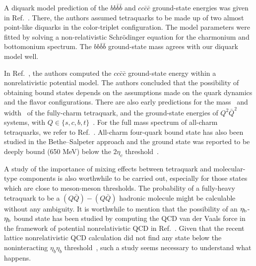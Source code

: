 \documentclass[twocolumn,showpacs,superscriptaddress,preprintnumbers,nofootinbib,prd]{revtex4-1}
\begin{document}
A diquark model prediction of the  $b b \bar b \bar b$ and $c c \bar c \bar c$
ground-state energies was given in Ref.~\cite{Berezhnoy:2011xn}.
There, the authors assumed tetraquarks to be made up of two almost point-like
diquarks in the color-triplet configuration. The model parameters were
fitted by solving a non-relativistic Schr\"odinger equation for the charmonium
and bottomonium spectrum. The $bb\bar b\bar b$ ground-state mass agrees with our
diquark model well.

In Ref.~\cite{Ader:1981db}, the authors computed the $c c \bar c \bar c$
ground-state energy within a nonrelativistic potential model.
The authors concluded that the possibility of obtaining bound states depends on
the assumptions made on the quark dynamics and the flavor configurations. There
are also early predictions for the mass~\cite{Iwasaki:1975pv} and width~\cite{chao:1981} of the
fully-charm tetraquark, and the ground-state energies of $Q^2 \bar{Q}^2$ systems, with
$Q\in \{s,c,b,t\}$~\cite{heller:1985}.
For the full mass spectrum of all-charm tetraquarks, we refer to Ref.~\cite{Debastiani:2017msn}.
All-charm four-quark bound state has also been studied in the Bethe--Salpeter approach and
the ground state was reported to be deeply bound (650 MeV) below the
$2\eta_c$ threshold~\cite{Heupel:2012ua}.

A study of the importance of mixing effects
between tetraquark and molecular-type components is also worthwhile to be
carried out, especially for those states which are close to meson-meson
thresholds. The probability of a fully-heavy tetraquark to be a
$(Q\bar{Q})-(Q\bar{Q})$ hadronic molecule might be calculable without any
ambiguity. It is worthwhile to mention that the possibility of an
$\eta_{\rm b}$-$\eta_{\rm b}$ bound state has been studied by computing the QCD van der
Vaals force in the framework of potential nonrelativistic QCD in Ref.~\cite{Brambilla:2016}.
Given that the recent lattice
nonrelativistic QCD calculation did not find any state below the noninteracting
$\eta_b\eta_b$ threshold~\cite{Hughes:2017xie}, such a study seems necessary to
understand what happens.
\end{document}
